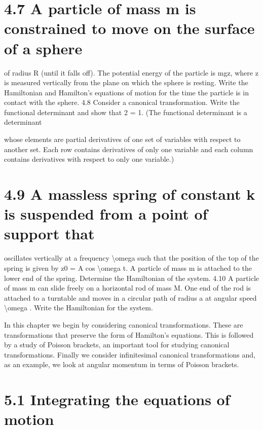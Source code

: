 \section*{4.7  A particle of mass m is constrained to move on the surface of a sphere}

of radius R (until it falls off). The potential energy of the particle is mgz,
where z is measured vertically from the plane on which the sphere is
resting. Write the Hamiltonian and Hamilton's equations of motion for
the time the particle is in contact with the sphere.
4.8 Consider a canonical transformation. Write the functional determinant
and show that 2 = 1. (The functional determinant is a determinant

whose elements are partial derivatives of one set of variables with respect
to another set. Each row contains derivatives of only one variable and
each column contains derivatives with respect to only one variable.)
\section*{4.9  A massless spring of constant k is suspended from a point of support that}

oscillates vertically at a frequency \textbackslash{}omega  such that the position of the top of
the spring is given by z0 = A cos \textbackslash{}omega t. A particle of mass m is attached to
the lower end of the spring. Determine the Hamiltonian of the system.
4.10 A particle of mass m can slide freely on a horizontal rod of mass M. One
end of the rod is attached to a turntable and moves in a circular path of
radius a at angular speed \textbackslash{}omega . Write the Hamiltonian for the system.

In this chapter we begin by considering canonical transformations. These are
transformations that preserve the form of Hamilton's equations. This is followed by a study of Poisson brackets, an important tool for studying
canonical transformations. Finally we consider infinitesimal canonical transformations and, as an example, we look at angular momentum in terms of
Poisson brackets.
\section*{5.1  Integrating the equations of motion}

